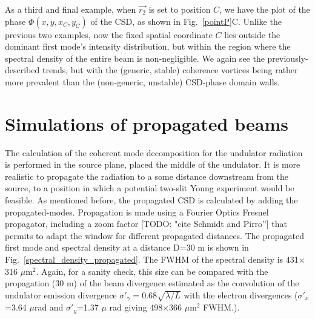 \documentclass{iucr}              %
\newcommand{\todo}[1]{{\color{red}[TODO: "#1'']}}
\begin{document}
As a third and final example, when $\vec{r_2}$ is set to position $C$, we have the plot of the phase $\Phi(x,y,x_C,y_C)$ of the CSD, as shown in Fig.~\ref{pointP}C.  Unlike the previous two examples, now the fixed spatial coordinate $C$ lies outside the dominant first mode's intensity distribution, but within the region where the spectral density of the entire beam is non-negligible.  We again see the previously-described trends, but with the (generic, stable) coherence vortices being rather more prevalent than the (non-generic, unstable) CSD-phase domain walls.    


\section{Simulations of propagated beams}

The calculation of the coherent mode decomposition for the undulator radiation is performed in the source plane, placed the middle of the undulator. It is more realistic to propagate the radiation to a some distance downstream from the source, to a position in which a potential two-slit Young experiment would be feasible. As mentioned before, the propagated CSD is calculated by adding the propagated-modes. Propagation is made using a Fourier Optics Fresnel propagator, including a zoom factor \todo{cite Schmidt and Pirro} that permits to adapt the window for different propagated distances. The propagated first mode and spectral density at a distance D=30 m is shown in Fig.~\ref{spectral_density_propagated}. The FWHM of the spectral density is 431$\times$316 $\mu$m$^2$. Again, for a sanity check, this size can be compared with the propagation (30 m) of the beam divergence estimated as the convolution of the undulator emission divergence $\sigma'_\gamma=0.68\sqrt{\lambda/L}$ with the electron divergences ($\sigma'_x$=3.64 $\mu$rad and $\sigma'_y$=1.37 $\mu$ rad giving 498$\times$366 $\mu$m$^2$ FWHM.). 
\end{document}
